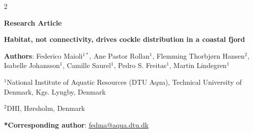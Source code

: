 \begin{spacing}{2}   %

\noindent

\noindent
\textbf{Research Article}   %

\noindent
\textbf{Habitat, not connectivity, drives cockle distribution in a coastal fjord}

\noindent
\textbf{Authors}: Federico Maioli$^{1*}$, Ane Pastor Rollan$^{1}$, Flemming Thorbjørn Hansen$^{2}$, Isabelle Johansson$^{1}$, Camille Saurel$^{1}$, Pedro S. Freitas$^{1}$, Martin Lindegren$^{1}$


\noindent

$^1$National Institute of Aquatic Resources (DTU Aqua), Technical University of Denmark, Kgs. Lyngby, Denmark

\noindent

$^2$DHI, Hørsholm, Denmark


\noindent
\textbf{*Corresponding author}: \href{mailto:fedma@aqua.dtu.dk}{fedma@aqua.dtu.dk}


\linenumbers
\setcounter{secnumdepth}{0}   %
\clearpage


\end{spacing}
